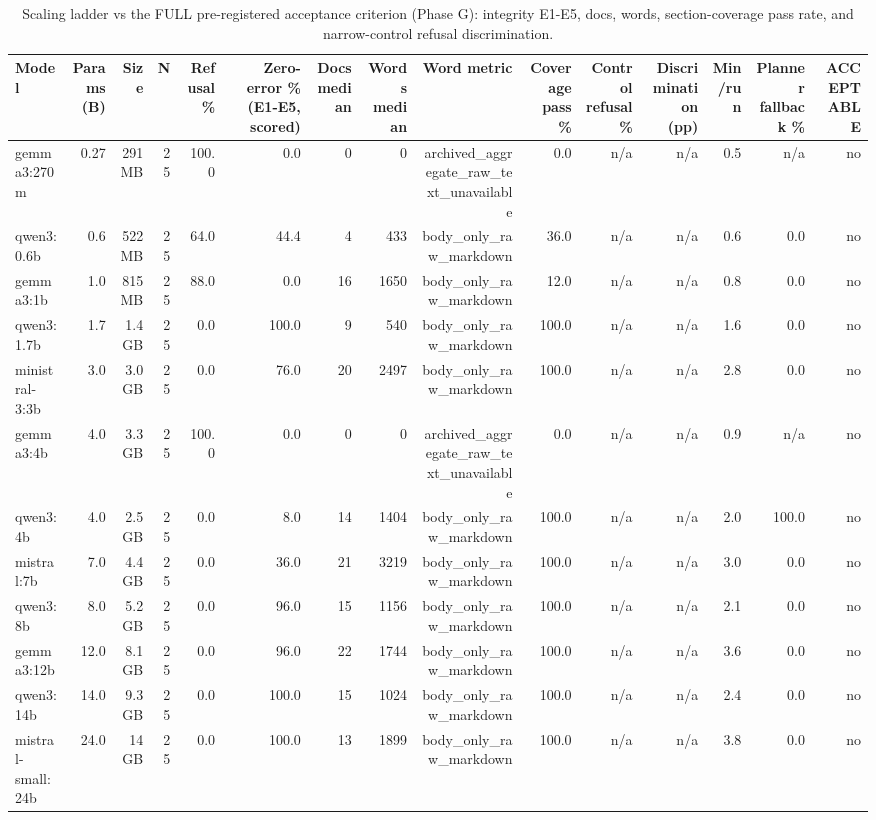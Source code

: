 \begin{table}[ht]
\centering
\caption{Scaling ladder vs the FULL pre-registered acceptance criterion (Phase G): integrity E1-E5, docs, words, section-coverage pass rate, and narrow-control refusal discrimination.}
\begin{tabular}{lrrrrrrrrrrrrrr}
\toprule
Model & Params (B) & Size & N & Refusal \% & Zero-error \% (E1-E5, scored) & Docs median & Words median & Word metric & Coverage pass \% & Control refusal \% & Discrimination (pp) & Min/run & Planner fallback \% & ACCEPTABLE \\
\midrule
gemma3:270m & 0.27 & 291 MB & 25 & 100.0 & 0.0 & 0 & 0 & archived\_aggregate\_raw\_text\_unavailable & 0.0 & n/a & n/a & 0.5 & n/a & no \\
qwen3:0.6b & 0.6 & 522 MB & 25 & 64.0 & 44.4 & 4 & 433 & body\_only\_raw\_markdown & 36.0 & n/a & n/a & 0.6 & 0.0 & no \\
gemma3:1b & 1.0 & 815 MB & 25 & 88.0 & 0.0 & 16 & 1650 & body\_only\_raw\_markdown & 12.0 & n/a & n/a & 0.8 & 0.0 & no \\
qwen3:1.7b & 1.7 & 1.4 GB & 25 & 0.0 & 100.0 & 9 & 540 & body\_only\_raw\_markdown & 100.0 & n/a & n/a & 1.6 & 0.0 & no \\
ministral-3:3b & 3.0 & 3.0 GB & 25 & 0.0 & 76.0 & 20 & 2497 & body\_only\_raw\_markdown & 100.0 & n/a & n/a & 2.8 & 0.0 & no \\
gemma3:4b & 4.0 & 3.3 GB & 25 & 100.0 & 0.0 & 0 & 0 & archived\_aggregate\_raw\_text\_unavailable & 0.0 & n/a & n/a & 0.9 & n/a & no \\
qwen3:4b & 4.0 & 2.5 GB & 25 & 0.0 & 8.0 & 14 & 1404 & body\_only\_raw\_markdown & 100.0 & n/a & n/a & 2.0 & 100.0 & no \\
mistral:7b & 7.0 & 4.4 GB & 25 & 0.0 & 36.0 & 21 & 3219 & body\_only\_raw\_markdown & 100.0 & n/a & n/a & 3.0 & 0.0 & no \\
qwen3:8b & 8.0 & 5.2 GB & 25 & 0.0 & 96.0 & 15 & 1156 & body\_only\_raw\_markdown & 100.0 & n/a & n/a & 2.1 & 0.0 & no \\
gemma3:12b & 12.0 & 8.1 GB & 25 & 0.0 & 96.0 & 22 & 1744 & body\_only\_raw\_markdown & 100.0 & n/a & n/a & 3.6 & 0.0 & no \\
qwen3:14b & 14.0 & 9.3 GB & 25 & 0.0 & 100.0 & 15 & 1024 & body\_only\_raw\_markdown & 100.0 & n/a & n/a & 2.4 & 0.0 & no \\
mistral-small:24b & 24.0 & 14 GB & 25 & 0.0 & 100.0 & 13 & 1899 & body\_only\_raw\_markdown & 100.0 & n/a & n/a & 3.8 & 0.0 & no \\
\bottomrule
\end{tabular}
\end{table}
